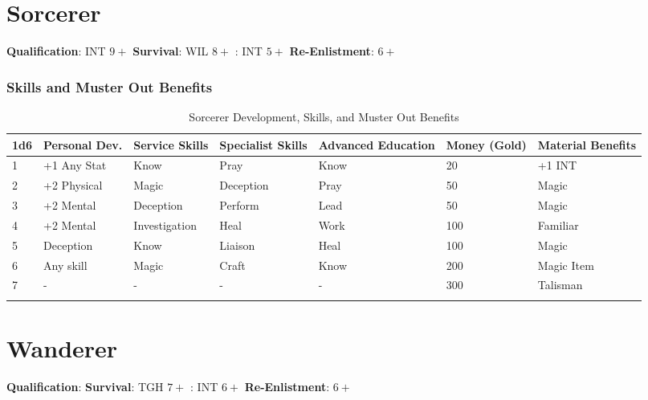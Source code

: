 \documentclass[itdr/core]{subfiles}
\begin{document}
\section{Sorcerer} 
\textbf{Qualification}: INT $9+$
\textbf{Survival}: WIL $8+$
: INT $5+$
\textbf{Re-Enlistment}: $6+$
\subsubsection{Skills and Muster Out Benefits}
\begin{longtable}{p{} p{} p{} p{} p{} p{} p{}}
\hline
\textbf{1d6} & \textbf{Personal Dev.} & \textbf{Service Skills} & \textbf{Specialist Skills} & \textbf{Advanced Education} & \textbf{Money (Gold)} & \textbf{Material Benefits} \\
\hline
1 & +1 Any Stat & Know & Pray & Know & 20 & +1 INT \\
2 & +2 Physical & Magic & Deception & Pray & 50 & Magic \\
3 & +2 Mental & Deception & Perform & Lead & 50 & Magic \\
4 & +2 Mental & Investigation & Heal & Work & 100 & Familiar \\
5 & Deception & Know & Liaison & Heal & 100 & Magic \\
6 & Any skill & Magic & Craft & Know & 200 & Magic Item \\
7 & - & - & - & - & 300 & Talisman \\
\hline
\caption{Sorcerer Development, Skills, and Muster Out Benefits}
\end{longtable}
\section{Wanderer}
\textbf{Qualification}: 
\textbf{Survival}: TGH $7+$
: INT $6+$
\textbf{Re-Enlistment}: $6+$
\end{document}

